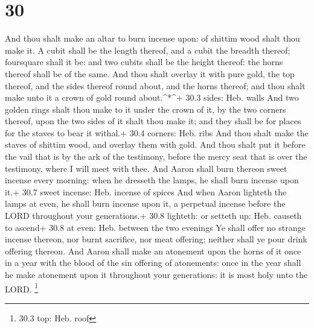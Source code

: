 \hypertarget{section-29}{%
\section{30}\label{section-29}}

 And thou shalt make an altar to burn incense upon: of
shittim wood shalt thou make it.  A cubit shall be the
length thereof, and a cubit the breadth thereof; foursquare shall it be:
and two cubits shall be the height thereof: the horns thereof shall be
of the same.  And thou shalt overlay it with pure gold, the
top thereof, and the sides thereof round about, and the horns thereof;
and thou shalt make unto it a crown of gold round about.\^{}*\^{}+ 30.3
sides: Heb. walls  And two golden rings shalt thou make to
it under the crown of it, by the two corners thereof, upon the two sides
of it shalt thou make it; and they shall be for places for the staves to
bear it withal.+ 30.4 corners: Heb. ribs  And thou shalt
make the staves of shittim wood, and overlay them with gold.
 And thou shalt put it before the vail that is by the ark of
the testimony, before the mercy seat that is over the testimony, where I
will meet with thee.  And Aaron shall burn thereon sweet
incense every morning: when he dresseth the lamps, he shall burn incense
upon it.+ 30.7 sweet incense: Heb. incense of spices  And
when Aaron lighteth the lamps at even, he shall burn incense upon it, a
perpetual incense before the LORD throughout your generations.+ 30.8
lighteth: or setteth up: Heb. causeth to ascend+ 30.8 at even: Heb.
between the two evenings  Ye shall offer no strange incense
thereon, nor burnt sacrifice, nor meat offering; neither shall ye pour
drink offering thereon.  And Aaron shall make an atonement
upon the horns of it once in a year with the blood of the sin offering
of atonements: once in the year shall he make atonement upon it
throughout your generations: it is most holy unto the LORD. \footnote{30.3
  top: Heb. roof}

